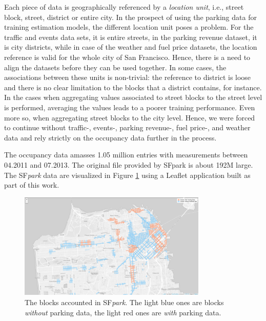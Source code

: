 \documentclass{ws-ijait}
\begin{document}
	Each piece of data is geographically referenced by a \textit{location unit}, i.e., street block, street, district or entire city. In the prospect of using the parking data for training estimation models, the different location unit poses a problem. For the traffic and events data sets, it is entire streets, in the parking revenue dataset, it is city districts, while in case of the weather and fuel price datasets, the location reference is valid for the whole city of San Francisco. Hence, there is a need to align the datasets before they can be used together. In some cases, the associations between these units is non-trivial: the reference to district is loose and there is no clear limitation to the blocks that a district contains, for instance. In the cases when aggregating values associated to street blocks to the street level is performed, averaging the values leads to a poorer training performance. Even more so, when aggregating street blocks to the city level. Hence, we were forced to continue without traffic-, events-, parking revenue-, fuel price-, and weather data and rely strictly on the occupancy data further in the process.
	
	The occupancy data amasses 1.05 million entries with measurements between 04.2011 and 07.2013. The original file provided by SFpark is about 192M large. The SF\textit{park} data are visualized in Figure \ref{fig:before_clustering} using a Leaflet application built as part of this work.
	
	\begin{figure}[!ht]
		\centering
		\includegraphics[width=0.8\textwidth]{../graphics/initial_view_before_clusteringV7.png}
		\caption{The blocks accounted in SF\textit{park}. The light blue ones are blocks \textit{without} parking data, the light red ones are \textit{with} parking data.}
		\label{fig:before_clustering}
	\end{figure}
		
\end{document}
